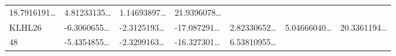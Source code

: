 \documentclass[
]{article}
\begin{document}
\begin{longtable}[]{@{}lllllll@{}}
\begin{minipage}[t]{0.12\columnwidth}
18.7916191\ldots{}\strut
\end{minipage} & \begin{minipage}[t]{0.12\columnwidth}\raggedright
4.81233135\ldots{}\strut
\end{minipage} & \begin{minipage}[t]{0.12\columnwidth}\raggedright
1.14693897\ldots{}\strut
\end{minipage} & \begin{minipage}[t]{0.12\columnwidth}\raggedright
21.9396078\ldots{}\strut
\end{minipage}\tabularnewline
\begin{minipage}[t]{0.08\columnwidth}\raggedright
KLHL26\strut
\end{minipage} & \begin{minipage}[t]{0.12\columnwidth}\raggedright
-6.3060655\ldots{}\strut
\end{minipage} & \begin{minipage}[t]{0.12\columnwidth}\raggedright
-2.3125193\ldots{}\strut
\end{minipage} & \begin{minipage}[t]{0.12\columnwidth}\raggedright
-17.087291\ldots{}\strut
\end{minipage} & \begin{minipage}[t]{0.12\columnwidth}\raggedright
2.82330652\ldots{}\strut
\end{minipage} & \begin{minipage}[t]{0.12\columnwidth}\raggedright
5.04666040\ldots{}\strut
\end{minipage} & \begin{minipage}[t]{0.12\columnwidth}\raggedright
20.3361194\ldots{}\strut
\end{minipage}\tabularnewline
\begin{minipage}[t]{0.08\columnwidth}\raggedright
48\strut
\end{minipage} & \begin{minipage}[t]{0.12\columnwidth}\raggedright
-5.4354855\ldots{}\strut
\end{minipage} & \begin{minipage}[t]{0.12\columnwidth}\raggedright
-2.3299163\ldots{}\strut
\end{minipage} & \begin{minipage}[t]{0.12\columnwidth}\raggedright
-16.327301\ldots{}\strut
\end{minipage} & \begin{minipage}[t]{0.12\columnwidth}\raggedright
6.53810955\ldots{}\strut

\end{minipage}
\end{longtable}
\end{document}
